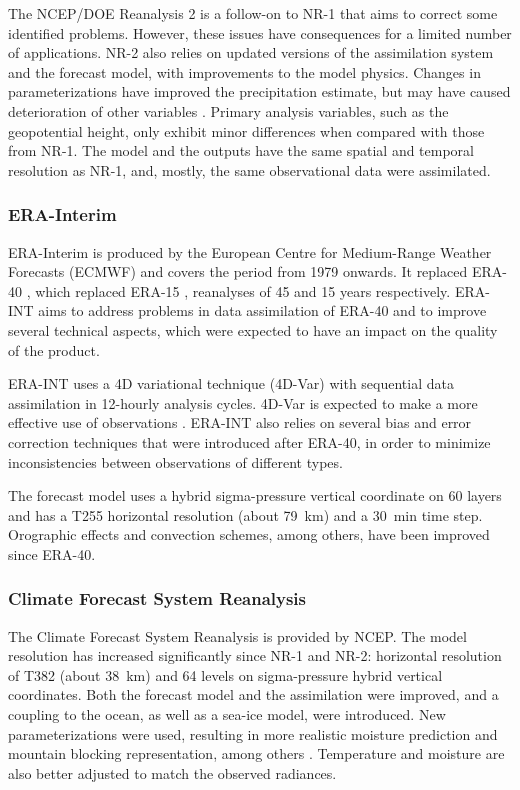 \documentclass[smallextended]{svjour3}       %
\begin{document}
	The NCEP/DOE Reanalysis 2 \citep[NR-2 --][]{Kanamitsu2002} is a follow-on to NR-1 that aims to correct some identified problems. However, these issues have consequences for a limited number of applications. NR-2 also relies on updated versions of the assimilation system and the forecast model, with improvements to the model physics. Changes in parameterizations have improved the precipitation estimate, but may have caused deterioration of other variables \citep{Kistler2001, Kanamitsu2002}. Primary analysis variables, such as the geopotential height, only exhibit minor differences when compared with those from NR-1. The model and the outputs have the same spatial and temporal resolution as NR-1, and, mostly, the same observational data were assimilated.
	
	
	\subsubsection{ERA-Interim}
	
	ERA-Interim \citep[ERA-INT --][]{Dee2011a} is produced by the European Centre for Medium-Range Weather Forecasts (ECMWF) and covers the period from 1979 onwards. It replaced ERA-40 \citep{Uppala2005}, which replaced ERA-15 \citep{Gibson1997}, reanalyses of 45 and 15 years respectively. ERA-INT aims to address problems in data assimilation of ERA-40 and to improve several technical aspects, which were expected to have an impact on the quality of the product.
	
	ERA-INT uses a 4D variational technique (4D-Var) with sequential data assimilation in 12-hourly analysis cycles. 4D-Var is expected to make a more effective use of observations \citep{Dee2011a}. ERA-INT also relies on several bias and error correction techniques that were introduced after ERA-40, in order to minimize inconsistencies between observations of different types.
	
	The forecast model uses a hybrid sigma-pressure vertical coordinate on 60 layers and has a T255 horizontal resolution (about 79~km) and a 30~min time step. Orographic effects and convection schemes, among others, have been improved since ERA-40.
	
	
	\subsubsection{Climate Forecast System Reanalysis}
	
	The Climate Forecast System Reanalysis \citep[CFSR --][]{Saha2010a} is provided by NCEP. The model resolution has increased significantly since NR-1 and NR-2: horizontal resolution of T382 (about 38~km) and 64 levels on sigma-pressure hybrid vertical coordinates. Both the forecast model and the assimilation were improved, and a coupling to the ocean, as well as a sea-ice model, were introduced. New parameterizations were used, resulting in more realistic moisture prediction and mountain blocking representation, among others \citep{Saha2010a}. Temperature and moisture are also better adjusted to match the observed radiances.
	
\end{document}
